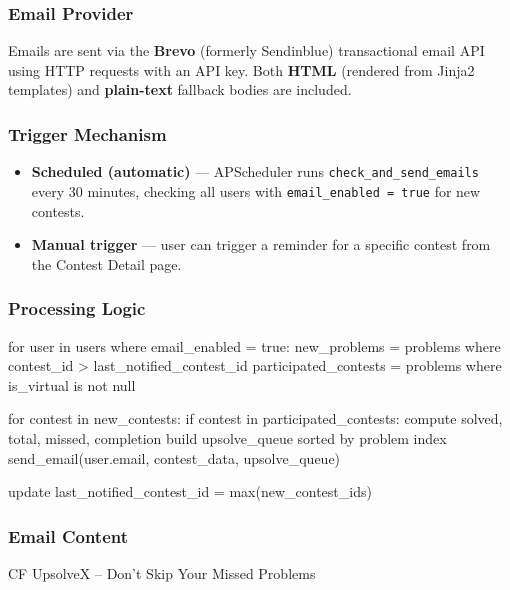 \documentclass[11pt, a4paper]{article}
\begin{document}
\subsubsection{Email Provider}

Emails are sent via the \textbf{Brevo} (formerly Sendinblue) transactional
email API using HTTP requests with an API key. Both \textbf{HTML} (rendered
from Jinja2 templates) and \textbf{plain-text} fallback bodies are included.

\subsubsection{Trigger Mechanism}

\begin{itemize}
  \item \textbf{Scheduled (automatic)} --- APScheduler runs
        \texttt{check\_and\_send\_emails} every 30 minutes, checking all users
        with \texttt{email\_enabled = true} for new contests.
  \item \textbf{Manual trigger} --- user can trigger a reminder for a specific
        contest from the Contest Detail page.
\end{itemize}

\subsubsection{Processing Logic}

\begin{codebox}
for user in users where email_enabled = true:
    new_problems = problems where contest_id > last_notified_contest_id
    participated_contests = problems where is_virtual is not null

    for contest in new_contests:
        if contest in participated_contests:
            compute solved, total, missed, completion%
            build upsolve_queue sorted by problem index
            send_email(user.email, contest_data, upsolve_queue)

    update last_notified_contest_id = max(new_contest_ids)
\end{codebox}

\subsubsection{Email Content}

\begin{codebox}
CF UpsolveX -- Don't Skip Your Missed Problems
\end{codebox}
\end{document}
